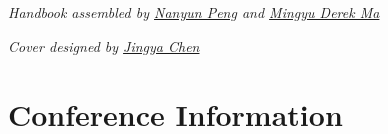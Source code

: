 \documentclass[twoside,makeidx]{book}
\begin{document}

\thispagestyle{empty}
\fancyfoot[C]{}
% 




\thispagestyle{empty}

% 

\vspace*{15.3em}
\noindent\emph{Handbook assembled by \href{https://vnpeng.net}{Nanyun Peng} and \href{https://mingyu.ma}{Mingyu Derek Ma}}\\ 

\noindent\emph{Cover designed by \href{https://jingyachen.net}{Jingya Chen}}\\

\newpage
\cleardoublepage
\fancyfoot[C]{\thepage}
\frontmatter





\setcounter{tocdepth}{1}
\tableofcontents
\mainmatter
\pagestyle{fancy}


\chapter{Conference Information}


\clearpage


\clearpage%
\setheaders{}{}


\clearpage

\end{document}
